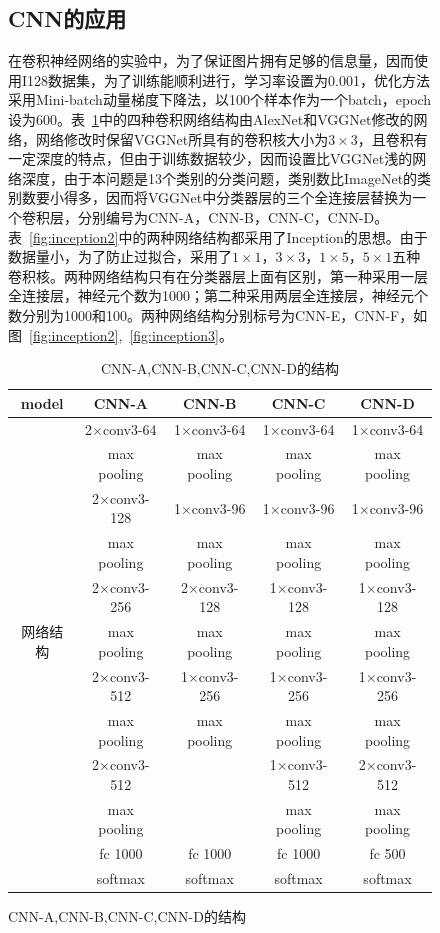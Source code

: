 \begin{figure}[htb]
\subsection{CNN的应用}
在卷积神经网络的实验中，为了保证图片拥有足够的信息量，因而使用I128数据集，为了训练能顺利进行，学习率设置为0.001，优化方法采用Mini-batch动量梯度下降法，以100个样本作为一个batch，epoch设为600。表~\ref{fig:cnn7}中的四种卷积网络结构由AlexNet和VGGNet修改的网络，网络修改时保留VGGNet所具有的卷积核大小为$3\times3$，且卷积有一定深度的特点，但由于训练数据较少，因而设置比VGGNet浅的网络深度，由于本问题是13个类别的分类问题，类别数比ImageNet的类别数要小得多，因而将VGGNet中分类器层的三个全连接层替换为一个卷积层，分别编号为CNN-A，CNN-B，CNN-C，CNN-D。表~\ref{fig:inception2}中的两种网络结构都采用了Inception的思想。由于数据量小，为了防止过拟合，采用了$1\times1$，$3\times3$，$1\times5$，$5\times1$五种卷积核。两种网络结构只有在分类器层上面有区别，第一种采用一层全连接层，神经元个数为1000；第二种采用两层全连接层，神经元个数分别为1000和100。两种网络结构分别标号为CNN-E，CNN-F，如图~\ref{fig:inception2},~\ref{fig:inception3}。
\newpage
\begin{table}[htb]
\centering
\caption{CNN-A,CNN-B,CNN-C,CNN-D的结构}
\begin{tabular}{ccccc}
\toprule[2pt]
model  & CNN-A & CNN-B & CNN-C & CNN-D \\ 
\midrule[1pt]
\ & 2$\times$conv3-64 & 1$\times$conv3-64 & 1$\times$conv3-64 & 1$\times$conv3-64 \\ 
\ & max pooling & max pooling & max pooling & max pooling \\ 
\ & 2$\times$conv3-128 & 1$\times$conv3-96 & 1$\times$conv3-96 & 1$\times$conv3-96 \\ 
\ & max pooling & max pooling & max pooling & max pooling \\ 
\ & 2$\times$conv3-256 & 2$\times$conv3-128 & 1$\times$conv3-128 & 1$\times$conv3-128 \\  
网络结构 & max pooling & max pooling & max pooling & max pooling \\  
\ & 2$\times$conv3-512 & 1$\times$conv3-256 & 1$\times$conv3-256 & 1$\times$conv3-256 \\ 
\ & max pooling & max pooling & max pooling & max pooling \\ 
\ & 2$\times$conv3-512 & \ & 1$\times$conv3-512 & 2$\times$conv3-512 \\ 
\ & max pooling & \ & max pooling & max pooling \\
\ & fc 1000 & fc 1000 & fc 1000 & fc 500 \\ 
\ & softmax & softmax & softmax & softmax \\ 
\bottomrule[2pt]
\end{tabular} 
\label{fig:cnn7}
\end{table}


\end{figure}
